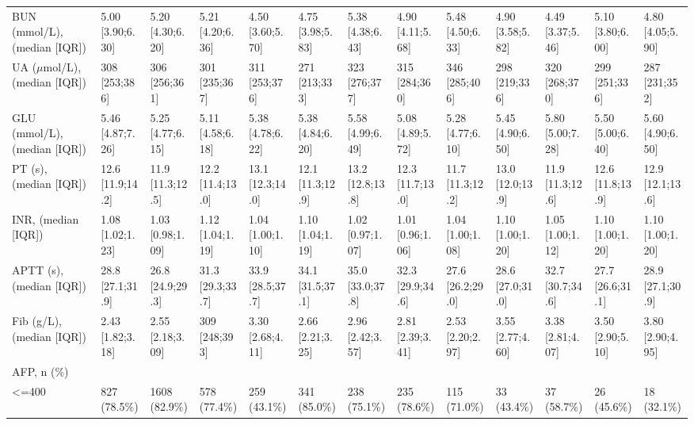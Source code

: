 \begin{landscape}
\begin{center}
\begin{longtable}{p{6.0cm}p{3.0cm}p{3.0cm}p{3.0cm}p{3.0cm}p{3.0cm}p{3.0cm}p{3.0cm}p{3.0cm}p{3.0cm}p{3.0cm}p{3.0cm}p{3.0cm}}
BUN (mmol/L), (median [IQR]) & 5.00 [3.90;6.30] & 5.20 [4.30;6.20] & 5.21 [4.20;6.36] & 4.50 [3.60;5.70] & 4.75 [3.98;5.83] & 5.38 [4.38;6.43] & 4.90 [4.11;5.68] & 5.48 [4.50;6.33] & 4.90 [3.58;5.82] & 4.49 [3.37;5.46] & 5.10 [3.80;6.00] & 4.80 [4.05;5.90] \\
UA ($\mu$mol/L), (median [IQR]) &  308 [253;386]   &  306 [256;361]   &  301 [235;367]   &  311 [253;376]   &  271 [213;333]   &  323 [276;377]   &  315 [284;360]   &  346 [285;406]   &  298 [219;336]   &  320 [268;370]   &  299 [251;336]   &  287 [231;352]   \\
GLU (mmol/L), (median [IQR]) & 5.46 [4.87;7.26] & 5.25 [4.77;6.15] & 5.11 [4.58;6.18] & 5.38 [4.78;6.22] & 5.38 [4.84;6.20] & 5.58 [4.99;6.49] & 5.08 [4.89;5.72] & 5.28 [4.77;6.10] & 5.45 [4.90;6.50] & 5.80 [5.00;7.28] & 5.50 [5.00;6.40] & 5.60 [4.90;6.50] \\
PT (s), (median [IQR]) & 12.6 [11.9;14.2] & 11.9 [11.3;12.5] & 12.2 [11.4;13.0] & 13.1 [12.3;14.0] & 12.1 [11.3;12.9] & 13.2 [12.8;13.8] & 12.3 [11.7;13.0] & 11.7 [11.3;12.2] & 13.0 [12.0;13.9] & 11.9 [11.3;12.6] & 12.6 [11.8;13.9] & 12.9 [12.1;13.6] \\
INR, (median [IQR]) & 1.08 [1.02;1.23] & 1.03 [0.98;1.09] & 1.12 [1.04;1.19] & 1.04 [1.00;1.10] & 1.10 [1.04;1.19] & 1.02 [0.97;1.07] & 1.01 [0.96;1.06] & 1.04 [1.00;1.08] & 1.10 [1.00;1.20] & 1.05 [1.00;1.12] & 1.10 [1.00;1.20] & 1.10 [1.00;1.20] \\
APTT (s), (median [IQR]) & 28.8 [27.1;31.9] & 26.8 [24.9;29.3] & 31.3 [29.3;33.7] & 33.9 [28.5;37.7] & 34.1 [31.5;37.1] & 35.0 [33.0;37.8] & 32.3 [29.9;34.6] & 27.6 [26.2;29.0] & 28.6 [27.0;31.0] & 32.7 [30.7;34.6] & 27.7 [26.6;31.1] & 28.9 [27.1;30.9] \\
Fib (g/L), (median [IQR]) & 2.43 [1.82;3.18] & 2.55 [2.18;3.09] &  309 [248;393]   & 3.30 [2.68;4.11] & 2.66 [2.21;3.25] & 2.96 [2.42;3.57] & 2.81 [2.39;3.41] & 2.53 [2.20;2.97] & 3.55 [2.77;4.60] & 3.38 [2.81;4.07] & 3.50 [2.90;5.10] & 3.80 [2.90;4.95] \\
AFP, n (\%) &                  &                  &                  &                  &                  &                  &                  &                  &                  &                  &                  &                  \\
    <=400 &   827 (78.5\%)    &   1608 (82.9\%)   &   578 (77.4\%)    &   259 (43.1\%)    &   341 (85.0\%)    &   238 (75.1\%)    &   235 (78.6\%)    &   115 (71.0\%)    &    33 (43.4\%)    &    37 (58.7\%)    &    26 (45.6\%)    &    18 (32.1\%)    \\

\end{longtable}
\end{center}
\end{landscape}
